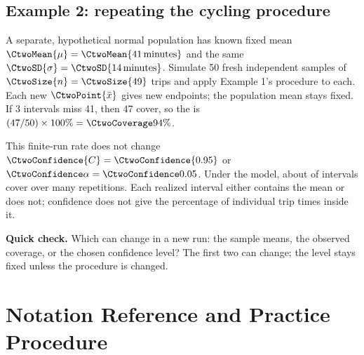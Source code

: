 \noindent\begin{minipage}{\linewidth}
\subsection{Example 2: repeating the cycling procedure}
\label{subsec:c2-coverage-example}
A separate, hypothetical normal population has known fixed mean $\CtwoMean{\mu}=\CtwoMean{41\,\text{minutes}}$ and the same $\CtwoSD{\sigma}=\CtwoSD{14\,\text{minutes}}$. Simulate 50 fresh independent samples of $\CtwoSize{n}=\CtwoSize{49}$ trips and apply Example 1's  procedure to each. Each new $\CtwoPoint{\bar{x}}$ gives new endpoints; the population mean stays fixed. If 3 intervals miss 41, then 47 cover, so the  is $(47/50)\times100\%=\CtwoCoverage{94\%}$.

This finite-run rate does not change $\CtwoConfidence{C}=\CtwoConfidence{0.95}$ or $\CtwoSignificance{\alpha}=\CtwoSignificance{0.05}$. Under the model, about  of intervals cover over many repetitions. Each realized interval either contains the mean or does not; confidence does not give the percentage of individual trip times inside it.

\textbf{Quick check.} Which can change in a new run: the sample means, the observed coverage, or the chosen confidence level? The first two can change; the level stays fixed unless the procedure is changed.
\par\vspace{3mm}
\end{minipage}\par

\clearpage
\section{Notation Reference and Practice Procedure}
\label{sec:notation-and-procedure}
\label{tab:notation-reference}


